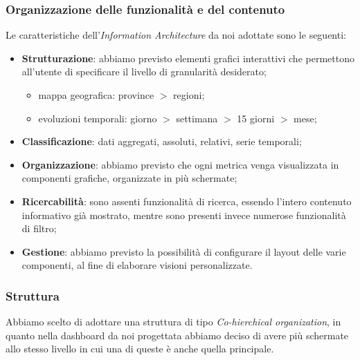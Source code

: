 \subsubsection{Organizzazione delle funzionalità e del contenuto}
\label{sss:organizzazione-funzionalita-contenuto}
Le caratteristiche dell'\textit{Information Architecture} da noi adottate sono le seguenti:
\begin{itemize}
	\item \textbf{Strutturazione}: abbiamo previsto elementi grafici interattivi che permettono all'utente di specificare il livello di granularità desiderato;
	\begin{itemize}
		\item mappa geografica: province $>$ regioni;
		\item evoluzioni temporali: giorno $>$ settimana $>$ 15 giorni $>$ mese;
	\end{itemize}
	\item \textbf{Classificazione}: dati aggregati, assoluti, relativi, serie temporali;
	\item \textbf{Organizzazione}: abbiamo previsto che ogni metrica venga visualizzata in componenti grafiche, organizzate in più schermate;
	\item \textbf{Ricercabilità}: sono assenti funzionalità di ricerca, essendo l'intero contenuto informativo già mostrato, mentre sono presenti invece numerose funzionalità di filtro;
	\item \textbf{Gestione}: abbiamo previsto la possibilità di configurare il layout delle varie componenti, al fine di elaborare visioni personalizzate.
\end{itemize}

\subsubsection{Struttura}
\label{sss:struttura}
Abbiamo scelto di adottare una struttura di tipo \textit{Co-hierchical organization}, in quanto nella dashboard da noi progettata abbiamo deciso di avere più schermate allo stesso livello in cui una di queste è anche quella principale.